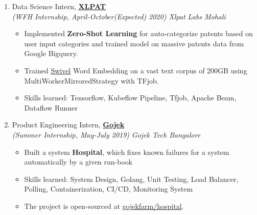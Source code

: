 \documentclass[a4paper,12pt]{awesome}
\newcommand{\psep}{-0.6cm}
\begin{document}
\begin{enumerate}
\item[] Data Science Intern, \textbf{\href{https://www.xlpat.com}{XLPAT}}\\
    \emph{(WFH Internship, April-October(Expected) 2020)} \hfill  \emph{Xlpat Labs Mohali}\\[-0.6cm]
    \begin{itemize}
        \item Implemented \textbf{Zero-Shot Learning} for auto-categorize patents based on user input categories and trained model on
         massive patents data from Google Bigquery.
        \item Trained \href{https://github.com/src-d/tensorflow-swivel}{Swivel} Word Embedding on a vast text corpus of 200GB using MultiWorkerMirroredStrategy with TFjob.
        \item Skills learned: Tensorflow, Kubeflow Pipeline, Tfjob, Apache Beam, Dataflow Runner
    \end{itemize}
\item[] Product Engineering Intern, \textbf{\href{https://www.gojek.io/}{Gojek}}\\
    \emph{(Summer Internship, May-July 2019)} \hfill  \emph{Gojek Tech Bangalore}\\[-0.6cm]
    \begin{itemize}
        \item Built a system \textbf{Hospital}, which fixes known failures for a system 
            automatically by a given run-book
        \item Skills learned: System Design, Golang, Unit Testing, Load Balancer, Polling, 
            Containerization, CI/CD, Monitoring System
        \item The project is open-sourced at \href{https://github.com/gojekfarm/hospital}{gojekfarm/hospital}.
    \end{itemize}
\end{enumerate}
\\[\psep]
\end{document}
